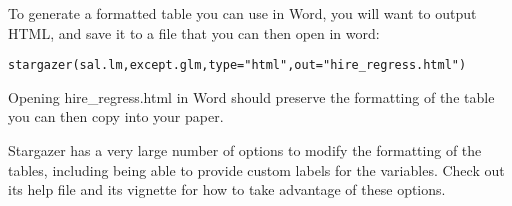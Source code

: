 \documentclass[12pt, oneside]{amsart}   	%
\begin{document}
To generate a formatted table you can use in Word, you will want to output HTML, and save it to a file that you can then open in word:

\begin{verbatim}
stargazer(sal.lm,except.glm,type="html",out="hire_regress.html")
\end{verbatim}

Opening hire\_regress.html in Word should preserve the formatting of the table you can then copy into your paper.

Stargazer has a very large number of options to modify the formatting of the tables, including being able to provide custom labels for the variables. Check out its help file and its vignette for how to take advantage of these options.
\end{document}
